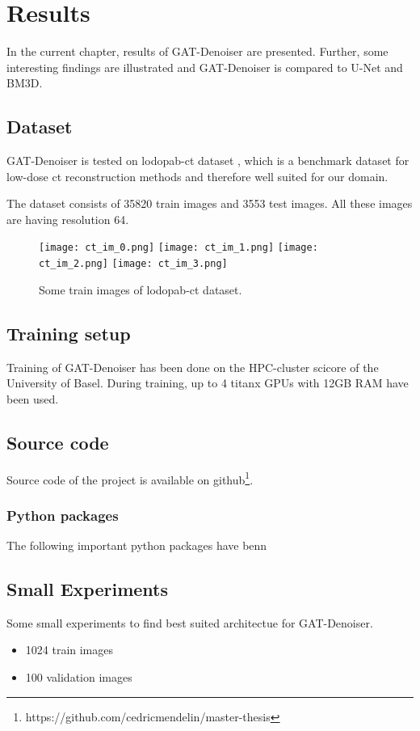 \chapter{Results}
\label{sec:results}

In the current chapter, results of GAT-Denoiser are presented.
Further, some interesting findings are illustrated and GAT-Denoiser
is compared to U-Net and BM3D\cite{bm3d}.


\section{Dataset}
GAT-Denoiser is tested on lodopab-ct dataset \cite{lodopab-dataset}, which is a 
benchmark dataset for low-dose ct reconstruction methods and therefore well suited for our domain.

The dataset consists of 35820 train images and 3553 test images.
All these images are having resolution 64.

\begin{figure}[H]
  \centering
  \texttt{[image: ct\_im\_0.png]}
  \texttt{[image: ct\_im\_1.png]}
  \texttt{[image: ct\_im\_2.png]}
  \texttt{[image: ct\_im\_3.png]}
  \caption{Some train images of lodopab-ct dataset.}
\end{figure}



\section{Training setup}
Training of GAT-Denoiser has been done on the HPC-cluster scicore of the University of Basel.
During training, up to 4 titanx GPUs with 12GB RAM have been used.


\section{Source code}
Source code of the project is available on github\footnote{https://github.com/cedricmendelin/master-thesis}.

\subsection{Python packages}
The following important python packages have benn 


\section{Small Experiments}
Some small experiments to find best suited architectue for GAT-Denoiser.
\begin{itemize}
  \item 1024 train images
  \item 100 validation images
\end{itemize}

